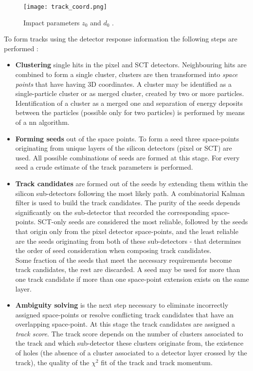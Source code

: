         	\begin{figure}[htbp]
        		\centering
    		\texttt{[image: track\_coord.png]}
    		\caption[Impact parameters]{Impact parameters $z_0$ and $d_0$ \cite{ATLAS:track}.}
    		\label{fig::z0d0}
  			 \end{figure}
  	To form tracks using the detector response information the following steps are performed \cite{ATLAS:track2}:
  	\begin{itemize}
  		\item \textbf{Clustering} single hits in the pixel and SCT detectors. Neighbouring hits are combined to form a single cluster, clusters are then transformed into \textit{space points} that have having 3D coordinates. A cluster may be identified as a single-particle cluster or as merged cluster, created by two or more particles. Identification of a cluster as a merged one and separation of energy deposits between the particles (possible only for two particles) is performed by means of a \gls{nn} algorithm. 
  		\item \textbf{Forming seeds} out of the space points. To form a seed three space-points originating from unique layers of the silicon detectors (pixel or SCT) are used. All possible combinations of seeds are formed at this stage. For every seed a crude estimate of the track parameters is performed. 
  		\item \textbf{Track candidates} are formed out of the seeds by extending them within the silicon sub-detectors following the most likely path. A combinatorial Kalman filter \cite{Fruhwirth:1987fm} is used to build the track candidates. The purity of the seeds depends significantly on the sub-detector that recorded the corresponding space-points. SCT-only seeds are considered the most reliable, followed by the seeds that origin only from the pixel detector space-points, and the least reliable are the seeds originating from both of these sub-detectors -  that determines the order of seed consideration when composing track candidates. \\Some fraction of the seeds that meet the necessary requirements become track candidates, the rest are discarded. A seed may be used for more than one track candidate if more than one space-point extension exists on the same layer.
  		\item \textbf{Ambiguity solving} is the next step necessary to eliminate incorrectly assigned space-points or resolve conflicting track candidates that have an overlapping space-point. At this stage the track candidates are assigned a \textit{track score}. The track score depends on the number of clusters associated to the track and which sub-detector these clusters originate from, the existence of holes (the absence of a cluster associated to a detector layer crossed by the track), the quality of the $\chi^2$ fit of the track and track momentum.
  		

\end{itemize}
